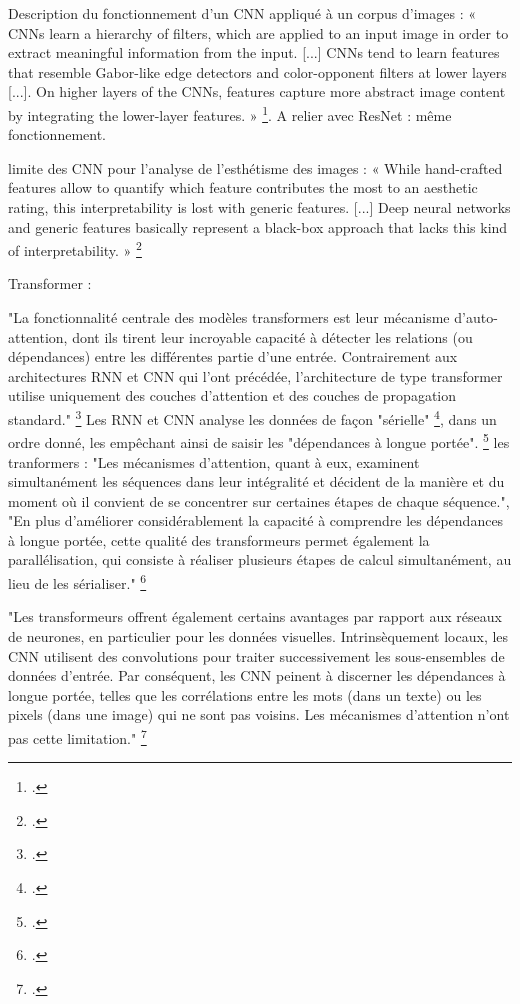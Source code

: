 Description du fonctionnement d'un CNN appliqué à un corpus d'images : « CNNs learn a hierarchy of filters, which are applied to an input image in order to extract meaningful information from the input. [...] CNNs tend to learn features that resemble Gabor-like edge detectors and color-opponent filters at lower layers [...]. On higher layers of the CNNs, features capture more abstract image content by integrating the lower-layer features. » \footcite{brachmann2017}. A relier avec ResNet : même fonctionnement. 

limite des CNN pour l'analyse de l'esthétisme des images : « While hand-crafted features allow to quantify which feature contributes the most to an aesthetic rating, this interpretability is lost with generic features. [...] Deep neural networks and generic features basically represent a black-box approach that lacks this kind of interpretability. » \footcite{brachmann2017}

Transformer : 

"La fonctionnalité centrale des modèles transformers est leur mécanisme d’auto-attention, dont ils tirent leur incroyable capacité à détecter les relations (ou dépendances) entre les différentes partie d’une entrée. Contrairement aux architectures RNN et CNN qui l’ont précédée, l’architecture de type transformer utilise uniquement des couches d’attention et des couches de propagation standard." \footcite{bergmann2025}
Les RNN et CNN analyse les données de façon "sérielle" \footcite{bergmann2025}, dans un ordre donné, les empêchant ainsi de saisir les "dépendances à longue portée". \footcite{bergmann2025}
les tranformers : "Les mécanismes d’attention, quant à eux, examinent simultanément les séquences dans leur intégralité et décident de la manière et du moment où il convient de se concentrer sur certaines étapes de chaque séquence.", "En plus d’améliorer considérablement la capacité à comprendre les dépendances à longue portée, cette qualité des transformeurs permet également la parallélisation, qui consiste à réaliser plusieurs étapes de calcul simultanément, au lieu de les sérialiser." \footcite{bergmann2025}

"Les transformeurs offrent également certains avantages par rapport aux réseaux de neurones, en particulier pour les données visuelles. Intrinsèquement locaux, les CNN utilisent des convolutions pour traiter successivement les sous-ensembles de données d’entrée.
Par conséquent, les CNN peinent à discerner les dépendances à longue portée, telles que les corrélations entre les mots (dans un texte) ou les pixels (dans une image) qui ne sont pas voisins. Les mécanismes d’attention n’ont pas cette limitation." \footcite{bergmann2025}

